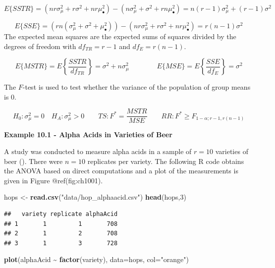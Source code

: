 \documentclass[
]{book}
\newenvironment{Shaded}{\begin{snugshade}}{\end{snugshade}}
\newcommand{\AttributeTok}[1]{\textcolor[rgb]{0.13,0.29,0.53}{#1}}
\newcommand{\DecValTok}[1]{\textcolor[rgb]{0.00,0.00,0.81}{#1}}
\newcommand{\FunctionTok}[1]{\textcolor[rgb]{0.13,0.29,0.53}{\textbf{#1}}}
\newcommand{\NormalTok}[1]{#1}
\newcommand{\OtherTok}[1]{\textcolor[rgb]{0.56,0.35,0.01}{#1}}
\newcommand{\SpecialCharTok}[1]{\textcolor[rgb]{0.81,0.36,0.00}{\textbf{#1}}}
\newcommand{\StringTok}[1]{\textcolor[rgb]{0.31,0.60,0.02}{#1}}
\begin{document}
\[
E\{SSTR\} = \left(nr\sigma_{\mu}^2 + r\sigma^2 + nr\mu_{\bullet}^2\right) -
\left(n\sigma_{\mu}^2+\sigma^2 +
rn\mu_{\bullet}^2\right) = n(r-1)\sigma_{\mu}^2 + (r-1)\sigma^2
\]

\[
E\{SSE\} = \left(rn\left(\sigma_{\mu}^2+\sigma^2 + \mu_{\bullet}^2\right)\right) -
\left(nr\sigma_{\mu}^2 + r\sigma^2 + nr\mu_{\bullet}^2\right) = r(n-1)\sigma^2
\] The expected mean squares are the expected sums of squares divided by
the degrees of freedom with \(df_{TR}=r-1\) and \(df_E=r(n-1)\).

\[
E\{MSTR\}=E\left\{\frac{SSTR}{df_{TR}}\right\} = \sigma^2 + n\sigma_{\mu}^2 
\qquad \qquad
E\{MSE\}=E\left\{\frac{SSE}{df_E}\right\} = \sigma^2
\]

The \(F\)-test is used to test whether the variance of the population of
group means is 0.

\[
H_0:\sigma_{\mu}^2=0 \quad H_A:\sigma_{\mu}^2>0 \qquad TS: F^*=\frac{MSTR}{MSE}
\qquad RR:F^*\geq F_{1-\alpha;r-1,r(n-1)}
\]

\textbf{Example 10.1 - Alpha Acids in Varieties of Beer}

A study was conducted to measure alpha acids in a sample of \(r=10\)
varieties of beer (). There
were \(n=10\) replicates per variety. The following R code obtains the
ANOVA based on direct computations and a plot of the measurements is
given in Figure @ref(fig:ch1001).

\begin{Shaded}
\begin{Highlighting}[]
\NormalTok{hops }\OtherTok{\textless{}{-}} \FunctionTok{read.csv}\NormalTok{(}\StringTok{"data/hop\_alphaacid.csv"}\NormalTok{)}
\FunctionTok{head}\NormalTok{(hops,}\DecValTok{3}\NormalTok{)}
\end{Highlighting}
\end{Shaded}

\begin{verbatim}
##   variety replicate alphaAcid
## 1       1         1       708
## 2       1         2       708
## 3       1         3       728
\end{verbatim}

\begin{Shaded}
\begin{Highlighting}[]
\FunctionTok{plot}\NormalTok{(alphaAcid }\SpecialCharTok{\textasciitilde{}} \FunctionTok{factor}\NormalTok{(variety), }\AttributeTok{data=}\NormalTok{hops, }\AttributeTok{col=}\StringTok{"orange"}\NormalTok{)}
\end{Highlighting}
\end{Shaded}
\end{document}

